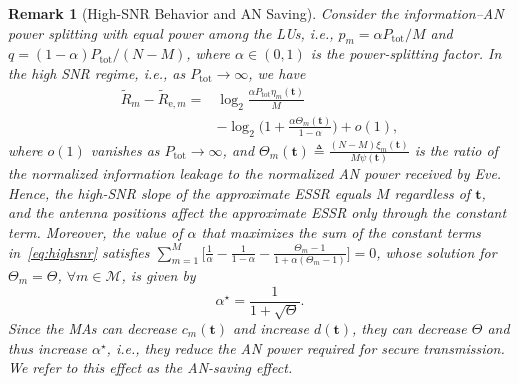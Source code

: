 \documentclass[journal]{IEEEtran}
\newtheorem{remark}{Remark}
\newcommand{\bt}{\mathbf{t}}
\newcommand{\Ptot}{P_{\mathrm{tot}}}
\begin{document}
\begin{remark}[High-SNR Behavior and AN Saving]\label{rem:highsnr}
Consider the information--AN power splitting with equal power among the LUs, i.e., $p_m=\alpha\Ptot/M$ and $q=(1-\alpha)\Ptot/(N-M)$, where $\alpha\in(0,1)$ is the power-splitting factor. In the high SNR regime, i.e., as $\Ptot\to\infty$, we have
\begin{equation}\label{eq:highsnr}
\begin{aligned}
\tilde R_m-\tilde R_{\mathrm{e},m}
={}&\log_2\frac{\alpha\Ptot\eta_m(\bt)}{M}\\
&-\log_2\Big(1+\frac{\alpha\Theta_m(\bt)}
 {1-\alpha}\Big)+o(1),
\end{aligned}
\end{equation}
where $o(1)$ vanishes as $\Ptot\to\infty$, and $\Theta_m(\bt)\triangleq\frac{(N-M)\xi_m(\bt)}{M\psi(\bt)}$ is the ratio of the normalized information leakage to the normalized AN power received by Eve. Hence, the high-SNR slope of the approximate ESSR equals $M$ regardless of $\bt$, and the antenna positions affect the approximate ESSR only through the constant term. Moreover, the value of $\alpha$ that maximizes the sum of the constant terms in~\eqref{eq:highsnr} satisfies $\sum_{m=1}^M\big[\frac1\alpha-\frac1{1-\alpha}-\frac{\Theta_m-1}{1+\alpha(\Theta_m-1)}\big]=0$, whose solution for $\Theta_m=\Theta$, $\forall m\in\mathcal M$, is given by
\begin{equation}\label{eq:alphastar}
\alpha^\star=\frac{1}{1+\sqrt{\Theta}}.
\end{equation}
Since the MAs can decrease $c_m(\bt)$ and increase $d(\bt)$, they can decrease $\Theta$ and thus increase $\alpha^\star$, i.e., they reduce the AN power required for secure transmission. We refer to this effect as the AN-saving effect.
\end{remark}
\end{document}
